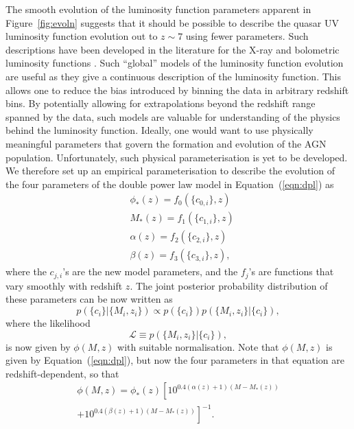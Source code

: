 \documentclass[fleqn,usenatbib]{mnras}
\begin{document}
The smooth evolution of the luminosity function parameters apparent in
Figure~\ref{fig:evoln} suggests that it should be possible to describe
the quasar UV luminosity function evolution out to $z\sim 7$ using
fewer parameters.  Such descriptions have been developed in the
literature for the X-ray \citep[e.g.,][]{2015MNRAS.451.1892A} and
bolometric luminosity functions \citep[e.g.,][]{2007ApJ...654..731H}.
Such ``global'' models of the luminosity function evolution are useful
as they give a continuous description of the luminosity function.
This allows one to reduce the bias introduced by binning the data in
arbitrary redshift bins.  By potentially allowing for extrapolations
beyond the redshift range spanned by the data, such models are
valuable for understanding of the physics behind the luminosity
function.  Ideally, one would want to use physically meaningful
parameters that govern the formation and evolution of the AGN
population.  Unfortunately, such physical parameterisation is yet to
be developed.  We therefore set up an empirical parameterisation to
describe the evolution of the four parameters of the double power law
model in Equation~(\ref{eqn:dpl}) as
\begin{align}
  &\phi_*(z) = f_0(\{c_{0,i}\}, z)\nonumber\\
  &M_*(z) = f_1(\{c_{1,i}\}, z)\nonumber\\
  &\alpha(z) = f_2(\{c_{2,i}\}, z)\nonumber\\
  &\beta(z) = f_3(\{c_{3,i}\}, z),
  \label{eqn:global}
\end{align}
where the $c_{j,i}$'s are the new model parameters, and the $f_j$'s
are functions that vary smoothly with redshift $z$.  The joint
posterior probability distribution of these parameters can be now
written as
\begin{equation}
  p(\{c_i\} | \{M_i, z_i\}) \propto p(\{c_i\})p(\{M_i, z_i\} | \{c_i\}),
\end{equation}
where the likelihood 
\begin{equation}
  \mathcal{L}\equiv p(\{M_i, z_i\} | \{c_i\}),
\end{equation}
is now given by $\phi(M,z)$ with suitable normalisation.  Note that
$\phi(M,z)$ is given by Equation~(\ref{eqn:dpl}), but now the four
parameters in that equation are redshift-dependent, so that
\begin{multline}
  \phi(M,z) = \phi_*(z) \left[10^{0.4(\alpha(z)+1)(M-M_*(z))}\right. \\ \left.+ 10^{0.4(\beta(z)+1)(M-M_*(z))}\right]^{-1}.
\end{multline}
\end{document}

